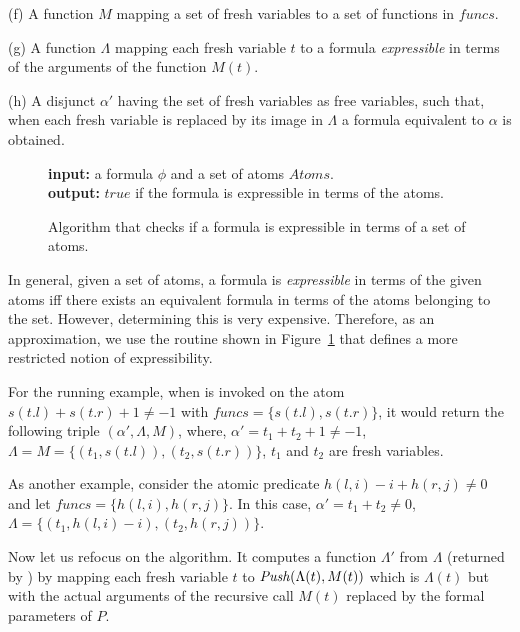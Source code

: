(f) A function $M$ mapping a set of fresh variables to a set of functions in $funcs$. 

(g) A function $\Lambda$ mapping each fresh variable $t$ to a formula \emph{expressible} 
in terms of the arguments of the function $M(t)$. 

(h) A disjunct $\alpha'$ having the set of fresh variables as free variables, such that, 
when each fresh variable is replaced by its image in $\Lambda$ a formula equivalent to $\alpha$ is obtained.

\begin{figure}
\begin{algorithm}[H]
\textbf{input: } a formula $\phi$ and a set of atoms $Atoms$. \\
\textbf{output: } $true$ if the formula is expressible in terms of the atoms. \\
\end{algorithm}
\caption{Algorithm that checks if a formula is expressible in terms of a set of atoms.} 
\label{fig:express-algo}
\end{figure}
%
In general, given a set of atoms, a formula is \emph{expressible} in terms of the given atoms iff 
there exists an equivalent formula in terms of the atoms belonging to the set.
However, determining this is very expensive.
Therefore, as an approximation, we use the routine \expressible shown in Figure~\ref{fig:express-algo} 
that defines a more restricted notion of expressibility.

For the running example, when \group is invoked on the atom $s(t.l) + s(t.r) + 1 \ne -1$ with 
$funcs = \{ s(t.l), s(t.r) \}$,
it would return the following triple $(\alpha',\Lambda,M)$, where, $\alpha' = t_1 + t_2 + 1 \ne -1$,
$\Lambda = M = \{ (t_1,s(t.l)), (t_2,s(t.r)) \}$, $t_1$ and $t_2$ are fresh variables.

As another example, consider the atomic predicate $h(l,i) - i + h(r,j) \ne 0$ and let 
$funcs = \{ h(l,i),h(r,j) \}$. In this case, $\alpha' = t_1 + t_2 \ne 0$, 
$\Lambda = \{ (t_1, h(l,i) - i), (t_2,h(r,j)) \}$.

Now let us refocus on the \SG algorithm. It computes a function $\Lambda'$ from $\Lambda$ 
(returned by \group) by mapping each fresh variable $t$ to $\mathit{Push_{}}(\Lambda(t),M(t))$ 
which is $\Lambda(t)$ but with the actual arguments of the recursive call $M(t)$ replaced by 
the formal parameters of $P$.

